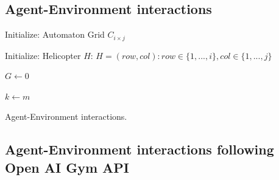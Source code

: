 \documentclass[
  openany]{book}
\begin{document}
\hypertarget{agent-environment-interactions}{%
\subsection{Agent-Environment interactions}\label{agent-environment-interactions}}

\newcommand\mycommfont[1]{\small\ttfamily\textcolor{olive}{#1}}
\begin{algorithm}[H]
\DontPrintSemicolon
\SetAlgoLined
{}
\BlankLine
{}

Initialize: Automaton Grid $C_{i \times j}$

Initialize: Helicopter $H$: $H = (row, col): row \in \{1,...,i\}, col \in \{1,...,j\}$

$G \longleftarrow 0$

$k \longleftarrow m$

\caption{Agent-Environment interactions.}
\end{algorithm}

\newpage

\hypertarget{agent-environment-interactions-following-open-ai-gym-api}{%
\subsection{Agent-Environment interactions following Open AI Gym API}\label{agent-environment-interactions-following-open-ai-gym-api}}
\end{document}
